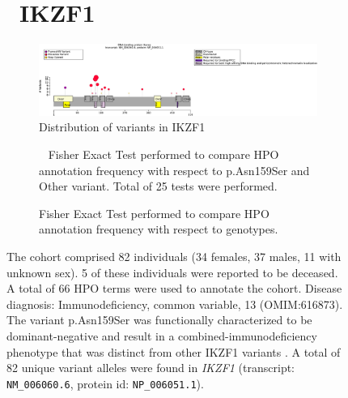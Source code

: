\begin{figure}[htbp]
\section*{ IKZF1}
\centering
\begin{subfigure}[b]{0.95\textwidth}
\centering
\includegraphics[width=\textwidth]{ img/IKZF1_protein_diagram.pdf} 
\captionsetup{justification=raggedright,singlelinecheck=false}
\caption{Distribution of variants in IKZF1}
\end{subfigure}

\vspace{2em}

\begin{subfigure}[b]{0.95\textwidth}
\centering
{}
\captionsetup{justification=raggedright,singlelinecheck=false}
\caption{         Fisher Exact Test performed to compare HPO annotation frequency with respect to p.Asn159Ser and Other variant. Total of
        25 tests were performed. }
\end{subfigure}
\vspace{2em}
\begin{subfigure}[b]{0.95\textwidth}
\centering
{}
\captionsetup{justification=raggedright,singlelinecheck=false}
\caption{Fisher Exact Test performed to compare HPO annotation frequency with respect to genotypes. }
\end{subfigure}

\vspace{2em}

\caption{ The cohort comprised 82 individuals (34 females, 37 males, 11 with unknown sex). 5 of these individuals were reported to be deceased. 
A total of 66 HPO terms were used to annotate the cohort. Disease diagnosis: Immunodeficiency, common variable, 13 (OMIM:616873). 
The variant p.Asn159Ser was functionally characterized to be dominant-negative and result in a combined-immunodeficiency phenotype that 
was distinct from other IKZF1 variants \cite{PMID_29889099}. A total of 82 unique variant alleles were found in \textit{IKZF1} (transcript: \texttt{NM\_006060.6}, protein id: \texttt{NP\_006051.1}).}
\end{figure}
